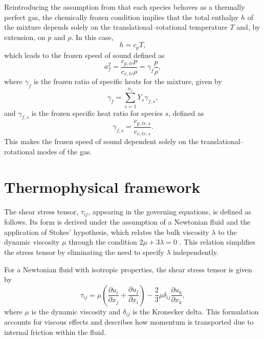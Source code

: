 Reintroducing the assumption from  that each species behaves as a thermally perfect gas, the chemically frozen condition implies that the total enthalpy $h$ of the mixture depends solely on the translational--rotational temperature $T$ and, by extension, on $p$ and $\rho$. In this case,
\begin{equation}
    h = c_p T,
\end{equation}
which leads to the frozen speed of sound defined as
\begin{equation}
    a^{2}_{f} = \frac{c_{p,tr} p}{c_{v,tr} \rho} = \gamma_{f} \frac{p}{\rho},
\end{equation}
where $\gamma_{f}$ is the frozen ratio of specific heats for the mixture, given by
\begin{equation}
    \gamma_{f} = \sum_{s=1}^{n_s} Y_s \gamma_{f,s},
\end{equation}
and $\gamma_{f,s}$ is the frozen specific heat ratio for species $s$, defined as
\begin{equation}\label{equation:frozengamma}
    \gamma_{f,s} = \frac{c_{p,tr,s}}{c_{v,tr,s}}.
\end{equation}
This makes the frozen speed of sound dependent solely on the translational--rotational modes of the gas.

\section{Thermophysical framework}
The shear stress tensor, $\tau_{ij}$, appearing in the governing equations, is defined as follows. Its form is derived under the assumption of a Newtonian fluid and the application of Stokes' hypothesis, which relates the bulk viscosity $\lambda$ to the dynamic viscosity $\mu$ through the condition $2\mu + 3\lambda = 0$ \citep{Ferziger1972,Giovangigli1999}. This relation simplifies the stress tensor by eliminating the need to specify $\lambda$ independently.

For a Newtonian fluid with isotropic properties, the shear stress tensor is given by
\begin{equation}
    \tau_{ij} = \mu \left(\frac{\partial u_i}{\partial x_j} + \frac{\partial u_j}{\partial x_i}\right)
    - \frac{2}{3} \mu \delta_{ij} \frac{\partial u_k}{\partial x_k},
\end{equation}
where $\mu$ is the dynamic viscosity and $\delta_{ij}$ is the Kronecker delta. This formulation accounts for viscous effects and describes how momentum is transported due to internal friction within the fluid.

